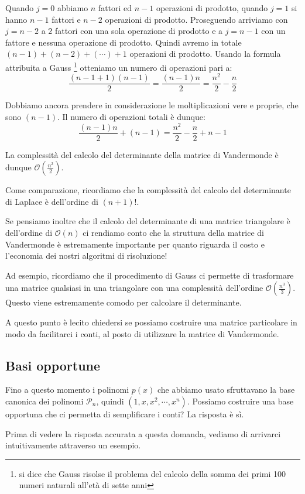 \documentclass{article}
\theoremstyle{plain}
\theoremstyle{plain}
\theoremstyle{definition}
\theoremstyle{definition}
\begin{document}
Quando $j=0$ abbiamo $n$ fattori ed $n-1$ operazioni di prodotto, quando $j=1$ si hanno $n-1$ fattori e $n-2$ operazioni di prodotto. Proseguendo arriviamo con $j=n-2$ a $2$ fattori con una sola operazione di prodotto e a $j=n-1$ con un fattore e nessuna operazione di prodotto. Quindi avremo in totale $(n-1)+(n-2)+(\cdots)+1$ operazioni di prodotto. Usando la formula attribuita a Gauss \footnote{si dice che Gauss risolse il problema del calcolo della somma dei primi 100 numeri naturali all'età di sette anni} otteniamo un numero di operazioni pari a:
\[
\frac{(n-1+1)(n-1)}{2}=
\frac{(n-1)n}{2}=
\frac{n^{2}}{2}-\frac{n}{2}
\]

Dobbiamo ancora prendere in considerazione le moltiplicazioni vere e proprie, che sono $(n-1)$.
Il numero di operazioni totali è dunque:
\[
\frac{(n-1)n}{2}+(n-1)=
\frac{n^{2}}{2}-\frac{n}{2}+n-1
\]

La complessità del calcolo del determinante della matrice di Vandermonde è dunque $\mathcal{O}(\frac{n^2}{2})$.

Come comparazione, ricordiamo che la complessità del calcolo del determinante di Laplace è dell'ordine di $(n+1)!$. 

Se pensiamo inoltre che il calcolo del determinante di una matrice triangolare è dell'ordine di $\mathcal{O}(n)$ ci rendiamo conto che la struttura della matrice di Vandermonde è estremamente importante per quanto riguarda il costo e l'economia dei nostri algoritmi di risoluzione!

Ad esempio, ricordiamo che il procedimento di Gauss ci permette di trasformare una matrice qualsiasi in una triangolare con una complessità dell'ordine $\mathcal{O}(\frac{n^3}{3})$. Questo viene estremamente comodo per calcolare il determinante.

A questo punto è lecito chiedersi se possiamo costruire una matrice particolare in modo da facilitarci i conti, al posto di utilizzare la matrice di Vandermonde.

\subsection{Basi opportune}
Fino a questo momento i polinomi $p(x)$ che abbiamo usato sfruttavano la base canonica dei polinomi $\mathcal{P}_{n}$, quindi $(1, x, x^2, \cdots, x^n)$. Possiamo costruire una base opportuna che ci permetta di semplificare i conti? La risposta è sì.

Prima di vedere la risposta accurata a questa domanda, vediamo di arrivarci intuitivamente attraverso un esempio.
\end{document}
